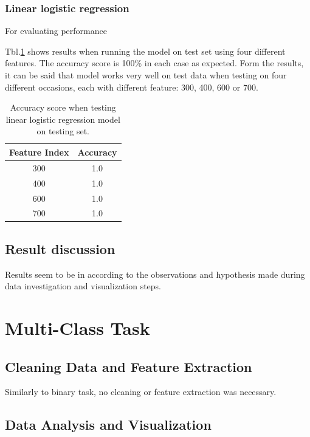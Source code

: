 \documentclass[11pt]{article}
\begin{document}
		\subsubsection{Linear logistic regression}
			For evaluating performance  

			Tbl.\ref{tbl:binary_test_table} shows results when running the model on test set using four different features. The accuracy score is 100\% in each case as expected. Form the results, it can be said that model works very well on test data when testing on four different occasions, each with different feature: 300, 400, 600 or 700.
			\begin{center}
		  	\begin{table}
		  	\centering
			\begin{tabular}[b]{|c | c|}
				 \hline
				 Feature Index 	 & Accuracy \\ 
 				 \hline
				 300 				& 1.0 	\\ 
				 400 				& 1.0 	\\ 
				 600		 		& 1.0 	\\ 
				 700				& 1.0 	\\ 
				 \hline
			\end{tabular}
			\caption{Accuracy score when testing linear logistic regression model on testing set.}
			\label{tbl:binary_test_table}
			\end{table}
		\end{center}
	\subsection{Result discussion}
		Results seem to be in according to the observations and hypothesis made during data investigation and visualization steps. 

	\section{Multi-Class Task}
		\subsection{Cleaning Data and Feature Extraction}
			Similarly to binary task, no cleaning or feature extraction was necessary.

		\subsection{Data Analysis and Visualization}
\end{document}
